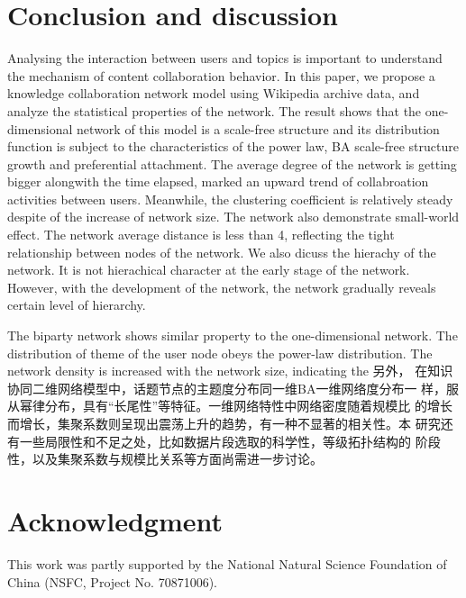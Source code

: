 \documentclass{elsarticle}
\begin{document}
\section{Conclusion and discussion }
\label{sec:5concl-disc-}

Analysing the interaction between users and topics is important to
understand the mechanism of content collaboration behavior. 
In this paper, we propose a knowledge collaboration network model
using  Wikipedia archive data, and analyze the statistical
properties of the network. The result shows that the
one-dimensional network of this model is a scale-free structure and
its distribution function is subject to the characteristics of the
power law, BA scale-free structure growth and preferential
attachment. The average degree of the network is getting bigger
alongwith the time elapsed, marked an upward trend of collabroation
activities between users. Meanwhile,  the clustering coefficient is
relatively steady despite of the increase of network size. The network
also demonstrate  small-world effect. The network average distance is
less than 4, reflecting the tight relationship between nodes of the
network. We also dicuss the hierachy of the network. It is not
hierachical character at the early stage of the network. However, with
the development of the network,  the network gradually reveals certain
level of hierarchy. 

The biparty network shows similar property to the one-dimensional
network. The distribution of theme of the user node obeys the
power-law distribution. The network density is increased with the
network size, indicating the  
另外，
在知识协同二维网络模型中，话题节点的主题度分布同一维BA一维网络度分布一
样，服从幂律分布，具有“长尾性”等特征。一维网络特性中网络密度随着规模比
的增长而增长，集聚系数则呈现出震荡上升的趋势，有一种不显著的相关性。本
研究还有一些局限性和不足之处，比如数据片段选取的科学性，等级拓扑结构的
阶段性，以及集聚系数与规模比关系等方面尚需进一步讨论。

\section*{Acknowledgment}
\label{sec:acknowledgment}
This work was partly supported by the National Natural Science Foundation of China (NSFC, Project No. 70871006).




\end{document}
